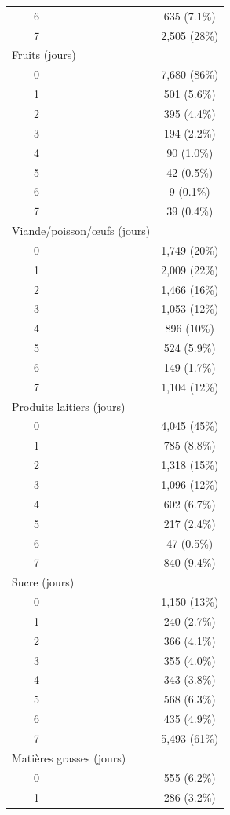 \documentclass[
]{article}
\begin{document}
\begin{table}[!t]
\begin{tabular*}{\linewidth}{@{\extracolsep{\fill}}lc}
    6 & 635 (7.1\%) \\ 
    7 & 2,505 (28\%) \\ 
Fruits (jours) &  \\ 
    0 & 7,680 (86\%) \\ 
    1 & 501 (5.6\%) \\ 
    2 & 395 (4.4\%) \\ 
    3 & 194 (2.2\%) \\ 
    4 & 90 (1.0\%) \\ 
    5 & 42 (0.5\%) \\ 
    6 & 9 (0.1\%) \\ 
    7 & 39 (0.4\%) \\ 
Viande/poisson/œufs (jours) &  \\ 
    0 & 1,749 (20\%) \\ 
    1 & 2,009 (22\%) \\ 
    2 & 1,466 (16\%) \\ 
    3 & 1,053 (12\%) \\ 
    4 & 896 (10\%) \\ 
    5 & 524 (5.9\%) \\ 
    6 & 149 (1.7\%) \\ 
    7 & 1,104 (12\%) \\ 
Produits laitiers (jours) &  \\ 
    0 & 4,045 (45\%) \\ 
    1 & 785 (8.8\%) \\ 
    2 & 1,318 (15\%) \\ 
    3 & 1,096 (12\%) \\ 
    4 & 602 (6.7\%) \\ 
    5 & 217 (2.4\%) \\ 
    6 & 47 (0.5\%) \\ 
    7 & 840 (9.4\%) \\ 
Sucre (jours) &  \\ 
    0 & 1,150 (13\%) \\ 
    1 & 240 (2.7\%) \\ 
    2 & 366 (4.1\%) \\ 
    3 & 355 (4.0\%) \\ 
    4 & 343 (3.8\%) \\ 
    5 & 568 (6.3\%) \\ 
    6 & 435 (4.9\%) \\ 
    7 & 5,493 (61\%) \\ 
Matières grasses (jours) &  \\ 
    0 & 555 (6.2\%) \\ 
    1 & 286 (3.2\%) \\ 

\end{tabular*}
\end{table}
\end{document}
